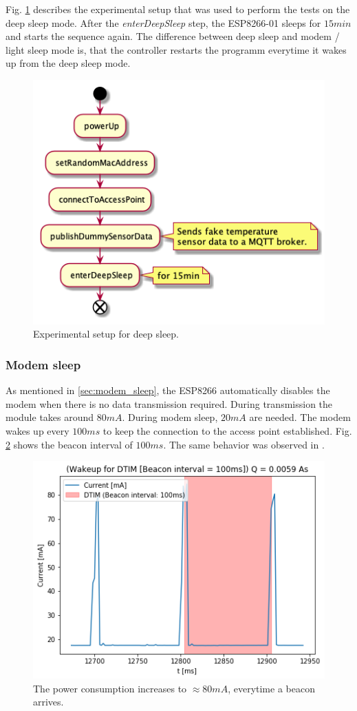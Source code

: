 Fig. \ref{fig:experiment_deep_sleep} describes the experimental setup that was used to perform the tests on the deep sleep mode.
After the \textit{enterDeepSleep} step, the ESP8266-01 sleeps for $15min$ and starts the sequence again.
The difference between deep sleep and modem / light sleep mode is, that the controller restarts the programm everytime it wakes up from the deep sleep mode.
\begin{figure}[h]
    \centering
    \includegraphics[width = 0.7 \linewidth]{fig/sequence_deep_sleep.png}
    \caption{Experimental setup for deep sleep.}
    \label{fig:experiment_deep_sleep}
\end{figure}

\subsubsection{Modem sleep}
As mentioned in \ref{sec:modem_sleep}, the ESP8266 automatically disables the modem when there is no data transmission required.
During transmission the module takes around $80mA$. During modem sleep, $20mA$ are needed.
The modem wakes up every $100ms$ to keep the connection to the access point established.
Fig. \ref{fig:beacon_interval} shows the beacon interval of $100ms$. 
The same behavior was observed in \cite{montori_is_2017}.

\begin{figure}[h]
    \includegraphics[width = \linewidth]{fig/beacon_interval.png}
    \caption{The power consumption increases to $\approx 80mA$, everytime a beacon arrives.}
    \label{fig:beacon_interval}
\end{figure}

